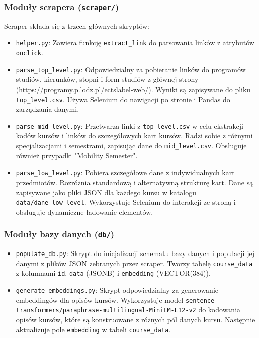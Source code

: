 \documentclass{article}
\begin{document}
\subsubsection{Moduły scrapera (\texttt{scraper/})}
Scraper składa się z trzech głównych skryptów:
\begin{itemize}
    \item \texttt{helper.py}: Zawiera funkcję \texttt{extract\_link} do parsowania linków z atrybutów \texttt{onclick}.
    \item \texttt{parse\_top\_level.py}: Odpowiedzialny za pobieranie linków do programów studiów, kierunków, stopni i form studiów z głównej strony (\url{https://programy.p.lodz.pl/ectslabel-web/}). Wyniki są zapisywane do pliku \texttt{top\_level.csv}. Używa Selenium do nawigacji po stronie i Pandas do zarządzania danymi.
    \item \texttt{parse\_mid\_level.py}: Przetwarza linki z \texttt{top\_level.csv} w celu ekstrakcji kodów kursów i linków do szczegółowych kart kursów. Radzi sobie z różnymi specjalizacjami i semestrami, zapisując dane do \texttt{mid\_level.csv}. Obsługuje również przypadki "Mobility Semester".
    \item \texttt{parse\_low\_level.py}: Pobiera szczegółowe dane z indywidualnych kart przedmiotów. Rozróżnia standardową i alternatywną strukturę kart. Dane są zapisywane jako pliki JSON dla każdego kursu w katalogu \texttt{data/dane\_low\_level}. Wykorzystuje Selenium do interakcji ze stroną i obsługuje dynamiczne ładowanie elementów.
\end{itemize}

\subsubsection{Moduły bazy danych (\texttt{db/})}
\begin{itemize}
    \item \texttt{populate\_db.py}: Skrypt do inicjalizacji schematu bazy danych i populacji jej danymi z plików JSON zebranych przez scraper. Tworzy tabelę \texttt{course\_data} z kolumnami \texttt{id}, \texttt{data} (JSONB) i \texttt{embedding} (VECTOR(384)).
    \item \texttt{generate\_embeddings.py}: Skrypt odpowiedzialny za generowanie embeddingów dla opisów kursów. Wykorzystuje model \texttt{sentence-transformers/\allowbreak paraphrase-multilingual-MiniLM-L12-v2} do kodowania opisów kursów, które są konstruowane z różnych pól danych kursu. Następnie aktualizuje pole \texttt{embedding} w tabeli \texttt{course\_data}.
\end{itemize}
\end{document}
